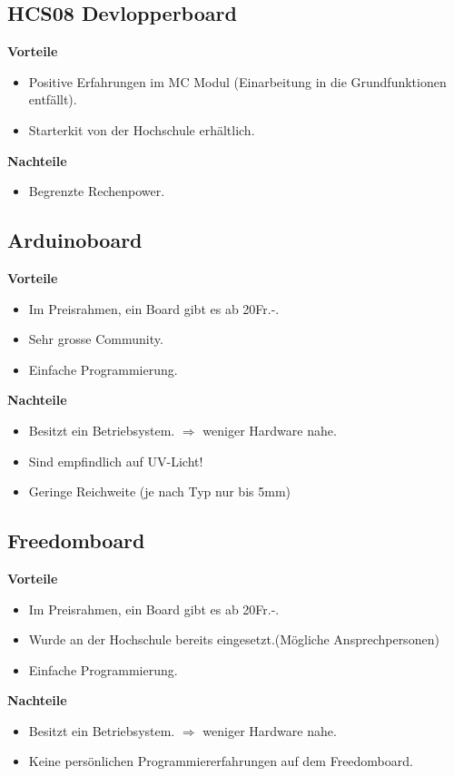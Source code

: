 \subsection{HCS08 Devlopperboard}
\textbf {Vorteile}
\begin{itemize}
\item Positive Erfahrungen im MC Modul (Einarbeitung in die Grundfunktionen entfällt).
\item Starterkit von der Hochschule erhältlich. \\
\end{itemize}
\textbf {Nachteile}
\begin{itemize}
\item Begrenzte Rechenpower.	
\end{itemize}

\subsection{Arduinoboard}
\textbf {Vorteile}
\begin{itemize}
\item Im Preisrahmen, ein Board gibt es ab 20Fr.-.
\item Sehr grosse Community.
\item Einfache Programmierung.\\
\end{itemize}
\textbf {Nachteile}
\begin{itemize}
\item Besitzt ein Betriebsystem. $\Rightarrow$ weniger Hardware nahe.
\item Sind empfindlich auf UV-Licht!
\item Geringe Reichweite (je nach Typ nur bis 5mm)
\end{itemize}

\subsection{Freedomboard}
\textbf {Vorteile}
\begin{itemize}
\item Im Preisrahmen, ein Board gibt es ab 20Fr.-.
\item Wurde an der Hochschule bereits eingesetzt.(Mögliche Ansprechpersonen)
\item Einfache Programmierung.\\
\end{itemize}
\textbf {Nachteile}
\begin{itemize}
\item Besitzt ein Betriebsystem. $\Rightarrow$ weniger Hardware nahe.
\item Keine persönlichen Programmiererfahrungen auf dem Freedomboard.
\end{itemize}

